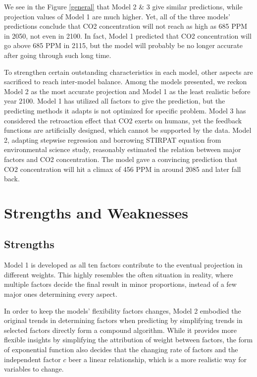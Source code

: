 \documentclass[12pt]{article}
\begin{document}
We see in the Figure \ref{general} that Model 2 \& 3 give similar predictions, while projection values of Model 1 are much higher. Yet, all of the three models' predictions conclude that CO2 concentration will not reach as high as 685 PPM in 2050, not even in 2100. In fact, Model 1 predicted that CO2 concentration will go above 685 PPM in 2115, but the model will probably be no longer accurate after going through such long time.

To strengthen certain outstanding characteristics in each model, other aspects are sacrificed to reach inter-model balance. Among the models presented, we reckon Model 2 as the most accurate projection and Model 1 as the least realistic before year 2100. Model 1 has utilized all factors to give the prediction, but the predicting methods it adapts is not optimized for specific problem. Model 3 has considered the retroaction effect that CO2 exerts on humans, yet the feedback functions are artificially designed, which cannot be supported by the data. Model 2, adapting stepwise regression and borrowing STIRPAT equation from environmental science study, reasonably estimated the relation between major factors and CO2 concentration. The model gave a convincing prediction that CO2 concentration will hit a climax of 456 PPM in around 2085 and later fall back.

\section{Strengths and Weaknesses}

\subsection*{Strengths}

Model 1 is developed as all ten factors contribute to the eventual projection in different weights. This highly resembles the often situation in reality, where multiple factors decide the final result in minor proportions, instead of a few major ones determining every aspect.

In order to keep the models' flexibility factors changes, Model 2 embodied the original trends in determining factors when predicting by simplifying trends in selected factors directly form a compound algorithm. While it provides more flexible insights by simplifying the attribution of weight between factors, the form of exponential function also decides that the changing rate of factors and the independent factor $c$ beer a linear relationship, which is a more realistic way for variables to change.
\end{document}
